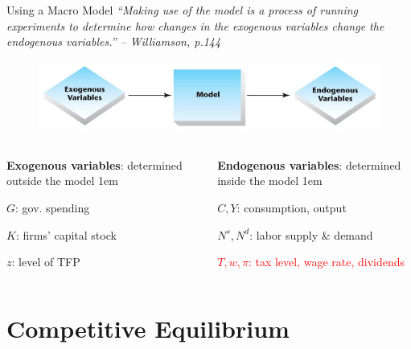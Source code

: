 \documentclass[11pt,aspectratio=43]{beamer}
\newcommand{\red}[1]{\textcolor{red}{#1}}
\let\olditemize=\itemize
\let\endolditemize=\enditemize
\renewenvironment{itemize}{\olditemize \itemsep1em}{\endolditemize}
\let\oldenumerate=\enumerate
\let\endoldenumerate=\endenumerate
\renewenvironment{enumerate}{\oldenumerate \itemsep1em}{ \endoldenumerate}
\theoremstyle{definition}
\begin{document}
\begin{frame}{Using a Macro Model}
\label{slide:Using_a_Macro_Model}
        \textit{\scriptsize ``Making use of the model is a process of running experiments to determine how changes in the exogenous variables change the endogenous variables.'' – Williamson, p.144}
    \begin{figure}
        \includegraphics[width=\textwidth]{./figures/MacroModelStructure.jpg}
    \end{figure}
    \begin{columns}
        \begin{column}{0.5\textwidth}
            \textbf{Exogenous variables}: determined \alert{outside} the model
            \begin{enumerate}
                \item $ G $: gov. spending
                \item $ K $: firms' capital stock
                \item $ z $: level of TFP
            \end{enumerate}
        \end{column}
        \begin{column}{0.5\textwidth}
            \textbf{Endogenous variables}: determined \alert{inside} the model
            \begin{itemize}
                \item $ C, Y$: consumption, output
                \item $ N^{s}, N^{d} $: labor supply \& demand
                \item \red{$ T, w, \pi $: tax level, wage rate, dividends}
            \end{itemize}
        \end{column}
    \end{columns}
\end{frame}

\section{Competitive Equilibrium}
\label{sec:Competitive_Equilibrium}
\end{document}
